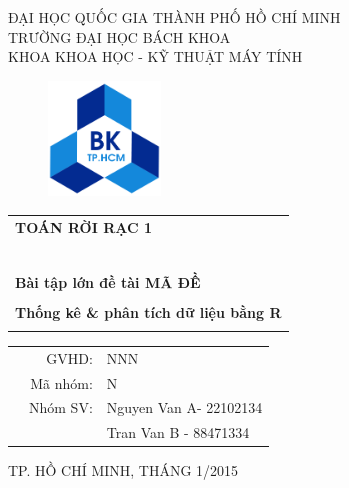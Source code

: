 \documentclass[a4paper]{article}
\begin{document}
\begin{titlepage}
\begin{center}
ĐẠI HỌC QUỐC GIA THÀNH PHỐ HỒ CHÍ MINH \\
TRƯỜNG ĐẠI HỌC BÁCH KHOA \\
KHOA KHOA HỌC - KỸ THUẬT MÁY TÍNH 
\end{center}

\vspace{1cm}

\begin{figure}[h!]
\begin{center}
\includegraphics[width=3cm]{hcmut.png}
\end{center}
\end{figure}

\vspace{1cm}


\begin{center}
\begin{tabular}{c}
\multicolumn{1}{l}{\textbf{{\Large TOÁN RỜI RẠC 1}}}\\
~~\\
\hline
\\
\multicolumn{1}{l}{\textbf{{\Large Bài tập lớn đề tài MÃ ĐỀ}}}\\
\\
\textbf{{\Huge Thống kê \& phân tích dữ liệu bằng R}}\\
\\
\hline
\end{tabular}
\end{center}

\vspace{3cm}

\begin{table}[h]
\begin{tabular}{rrl}
\hspace{5 cm} & GVHD: & NNN\\
& Mã nhóm: & N \\
& Nhóm SV: & Nguyen Van A- 22102134 \\
& & Tran Van B - 88471334 \\
\end{tabular}
\end{table}

\begin{center}
{\footnotesize TP. HỒ CHÍ MINH, THÁNG 1/2015}
\end{center}
\end{titlepage}
\end{document}
